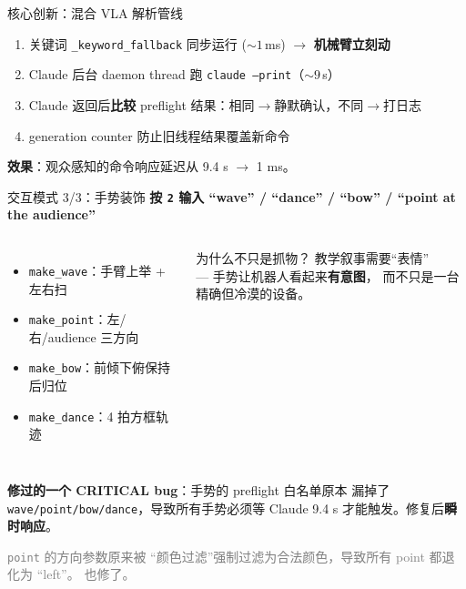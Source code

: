 \documentclass[aspectratio=169, 11pt]{beamer}
\begin{document}
\begin{frame}{核心创新：混合 VLA 解析管线}
\begin{center}
\end{center}

\vspace{6pt}
\begin{enumerate}\footnotesize
\item 关键词 \texttt{\_keyword\_fallback} 同步运行 ($\sim 1$\,ms) $\to$ \textbf{机械臂立刻动}
\item Claude 后台 daemon thread 跑 \texttt{claude --print}（$\sim 9$\,s）
\item Claude 返回后\textbf{比较} preflight 结果：相同$\to$静默确认，不同$\to$打日志
\item generation counter 防止旧线程结果覆盖新命令
\end{enumerate}

\textbf{效果}：观众感知的命令响应延迟从 9.4 s $\to$ 1 ms。
\end{frame}

\begin{frame}{交互模式 3/3：手势装饰}
\textbf{按 \texttt{2} 输入 ``wave'' / ``dance'' / ``bow'' / ``point at the audience''}

\vspace{6pt}
\begin{columns}
\begin{itemize}\footnotesize
  \item \texttt{make\_wave}：手臂上举 + 左右扫
  \item \texttt{make\_point}：左/右/audience 三方向
  \item \texttt{make\_bow}：前倾下俯保持后归位
  \item \texttt{make\_dance}：4 拍方框轨迹
\end{itemize}

\begin{block}{为什么不只是抓物？}
\footnotesize
教学叙事需要``表情''
\\— 手势让机器人看起来\textbf{有意图}，
而不只是一台精确但冷漠的设备。
\end{block}
\end{columns}

\vspace{8pt}
\textbf{修过的一个 CRITICAL bug}：手势的 preflight 白名单原本
漏掉了 \texttt{wave/point/bow/dance}，导致所有手势必须等
Claude 9.4 s 才能触发。修复后\textbf{瞬时响应}。

\vspace{4pt}
\textcolor{gray}{\scriptsize \texttt{point} 的方向参数原来被
``颜色过滤''强制过滤为合法颜色，导致所有 point 都退化为 ``left''。
也修了。}
\end{frame}
\end{document}
